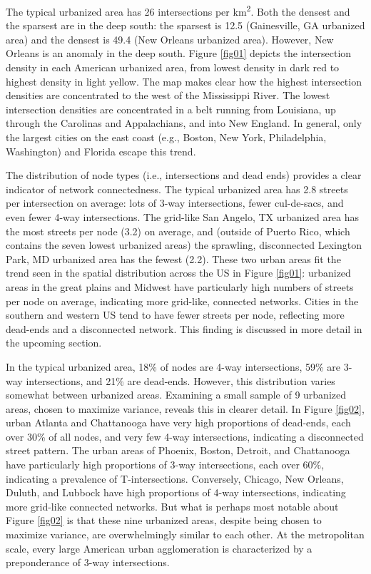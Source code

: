 \documentclass[Afour,sageh,times]{sage/sagej}
\begin{document}
The typical urbanized area has 26 intersections per km\textsuperscript{2}. Both the densest and the sparsest are in the deep south: the sparsest is 12.5 (Gainesville, GA urbanized area) and the densest is 49.4 (New Orleans urbanized area). However, New Orleans is an anomaly in the deep south. Figure \ref{fig01} depicts the intersection density in each American urbanized area, from lowest density in dark red to highest density in light yellow. The map makes clear how the highest intersection densities are concentrated to the west of the Mississippi River. The lowest intersection densities are concentrated in a belt running from Louisiana, up through the Carolinas and Appalachians, and into New England. In general, only the largest cities on the east coast (e.g., Boston, New York, Philadelphia, Washington) and Florida escape this trend.

The distribution of node types (i.e., intersections and dead ends) provides a clear indicator of network connectedness. The typical urbanized area has 2.8 streets per intersection on average: lots of 3-way intersections, fewer cul-de-sacs, and even fewer 4-way intersections. The grid-like San Angelo, TX urbanized area has the most streets per node (3.2) on average, and (outside of Puerto Rico, which contains the seven lowest urbanized areas) the sprawling, disconnected Lexington Park, MD urbanized area has the fewest (2.2). These two urban areas fit the trend seen in the spatial distribution across the US in Figure \ref{fig01}: urbanized areas in the great plains and Midwest have particularly high numbers of streets per node on average, indicating more grid-like, connected networks. Cities in the southern and western US tend to have fewer streets per node, reflecting more dead-ends and a disconnected network. This finding is discussed in more detail in the upcoming section.

In the typical urbanized area, 18\% of nodes are 4-way intersections, 59\% are 3-way intersections, and 21\% are dead-ends. However, this distribution varies somewhat between urbanized areas. Examining a small sample of 9 urbanized areas, chosen to maximize variance, reveals this in clearer detail. In Figure \ref{fig02}, urban Atlanta and Chattanooga have very high proportions of dead-ends, each over 30\% of all nodes, and very few 4-way intersections, indicating a disconnected street pattern. The urban areas of Phoenix, Boston, Detroit, and Chattanooga have particularly high proportions of 3-way intersections, each over 60\%, indicating a prevalence of T-intersections. Conversely, Chicago, New Orleans, Duluth, and Lubbock have high proportions of 4-way intersections, indicating more grid-like connected networks. But what is perhaps most notable about Figure \ref{fig02} is that these nine urbanized areas, despite being chosen to maximize variance, are overwhelmingly similar to each other. At the metropolitan scale, every large American urban agglomeration is characterized by a preponderance of 3-way intersections.
\end{document}
